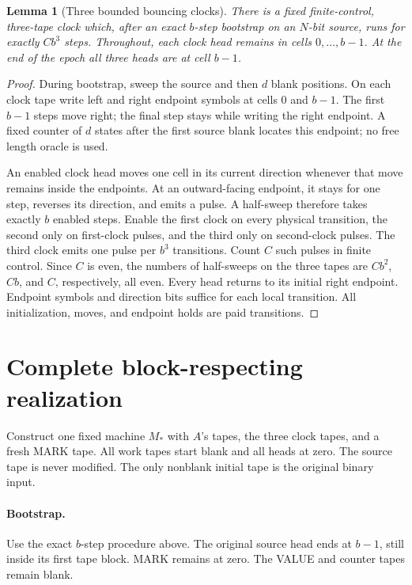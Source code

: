 \documentclass[11pt]{article}
\newtheorem{lemma}{Lemma}
\begin{document}
\begin{lemma}[Three bounded bouncing clocks]
There is a fixed finite-control, three-tape clock which, after an exact
$b$-step bootstrap on an $N$-bit source, runs for exactly $Cb^3$ steps.
Throughout, each clock head remains in cells $0,\ldots,b-1$.
At the end of the epoch all three heads are at cell $b-1$.
\end{lemma}
\begin{proof}
During bootstrap, sweep the source and then $d$ blank positions. On each
clock tape write left and right endpoint symbols at cells $0$ and $b-1$.
The first $b-1$ steps move right; the final step stays while writing the
right endpoint. A fixed counter of $d$ states after the first source
blank locates this endpoint; no free length oracle is used.

An enabled clock head moves one cell in its current direction whenever
that move remains inside the endpoints. At an outward-facing endpoint,
it stays for one step, reverses its direction, and emits a pulse.
A half-sweep therefore takes exactly $b$ enabled steps. Enable the first
clock on every physical transition, the second only on first-clock
pulses, and the third only on second-clock pulses. The third clock emits
one pulse per $b^3$ transitions. Count $C$ such pulses in finite control.
Since $C$ is even, the numbers of half-sweeps on the three tapes are
$Cb^2$, $Cb$, and $C$, respectively, all even. Every head returns to its
initial right endpoint. Endpoint symbols and direction bits suffice for
each local transition. All initialization, moves, and endpoint holds are
paid transitions.
\end{proof}

\section{Complete block-respecting realization}
Construct one fixed machine $M_*$ with $A$'s tapes, the three clock tapes,
and a fresh MARK tape. All work tapes start blank and all heads at zero.
The source tape is never modified. The only nonblank initial tape is the
original binary input.

\paragraph{Bootstrap.}
Use the exact $b$-step procedure above. The original source head ends at
$b-1$, still inside its first tape block. MARK remains at zero. The
VALUE and counter tapes remain blank.
\end{document}
